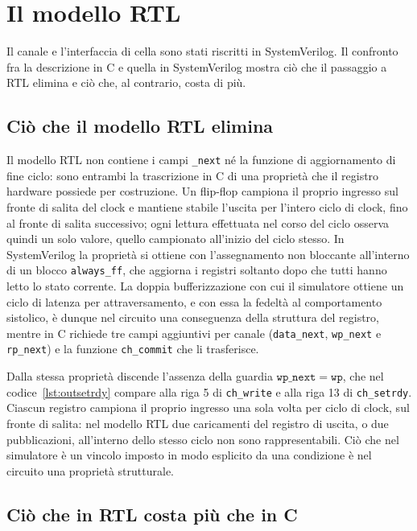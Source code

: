 \section{Il modello RTL}
\label{sec:rtl}

Il canale e l'interfaccia di cella sono stati riscritti in SystemVerilog. Il
confronto fra la descrizione in C e quella in SystemVerilog mostra ciò che il
passaggio a RTL elimina e ciò che, al contrario, costa di più.

\subsection{Ciò che il modello RTL elimina}

Il modello RTL non contiene i campi \texttt{\_next} né la funzione di
aggiornamento di fine ciclo: sono entrambi la trascrizione in C di una
proprietà che il registro hardware possiede per costruzione. Un flip-flop
campiona il proprio ingresso sul fronte di salita del clock e mantiene stabile
l'uscita per l'intero ciclo di clock, fino al fronte di salita successivo; ogni
lettura effettuata nel corso del ciclo osserva quindi un solo valore, quello
campionato all'inizio del ciclo stesso. In SystemVerilog la proprietà si
ottiene con l'assegnamento non bloccante all'interno di un blocco
\texttt{always\_ff}, che aggiorna i registri soltanto dopo che tutti hanno
letto lo stato corrente. La doppia bufferizzazione con cui il simulatore
ottiene un ciclo di latenza per attraversamento, e con essa la fedeltà al
comportamento sistolico, è dunque nel circuito una conseguenza della struttura
del registro, mentre in C richiede tre campi aggiuntivi per canale
(\texttt{data\_next}, \texttt{wp\_next} e \texttt{rp\_next}) e la funzione
\texttt{ch\_commit} che li trasferisce.

Dalla stessa proprietà discende l'assenza della guardia
$\mathtt{wp\_next} = \mathtt{wp}$, che nel codice~\ref{lst:outsetrdy} compare
alla riga 5 di \texttt{ch\_write} e alla riga 13 di \texttt{ch\_setrdy}. Ciascun
registro campiona il proprio ingresso una sola volta per ciclo di clock, sul
fronte di salita: nel modello RTL due caricamenti
del registro di uscita, o due pubblicazioni, all'interno dello stesso ciclo
non sono rappresentabili. Ciò che nel simulatore è un vincolo imposto in modo
esplicito da una condizione è nel circuito una proprietà strutturale.


\subsection{Ciò che in RTL costa più che in C}

